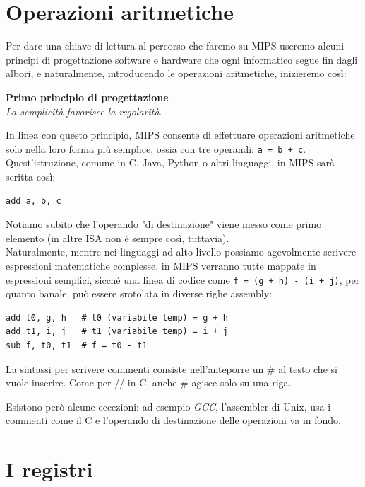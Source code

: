 \documentclass[class=book, crop=false]{standalone}
\begin{document}
\section{Operazioni aritmetiche}
Per dare una chiave di lettura al percorso che faremo su MIPS useremo alcuni principi di progettazione software e hardware che ogni informatico segue fin dagli albori, e naturalmente, introducendo le operazioni aritmetiche, inizieremo così:

\vspace{8pt}
\begin{tcolorbox}
\centering
\textbf{Primo principio di progettazione}\\
\emph{La semplicità favorisce la regolarità}.
\end{tcolorbox}
\vspace{5pt}

In linea con questo principio, MIPS consente di effettuare operazioni aritmetiche solo nella loro forma più semplice, ossia con tre operandi: \texttt{a = b + c}.
Quest'istruzione, comune in C, Java, Python o altri linguaggi, in MIPS sarà scritta così:
\begin{verbatim}
add a, b, c
\end{verbatim}

Notiamo subito che l'operando "di destinazione" viene messo come primo elemento (in altre ISA non è sempre così, tuttavia).\\
Naturalmente, mentre nei linguaggi ad alto livello possiamo agevolmente scrivere espressioni matematiche complesse, in MIPS verranno tutte mappate in espressioni semplici, sicché una linea di codice come \texttt{f = (g + h) - (i + j)}, per quanto banale, può essere srotolata in diverse righe assembly:

\begin{verbatim}
add t0, g, h   # t0 (variabile temp) = g + h
add t1, i, j   # t1 (variabile temp) = i + j
sub f, t0, t1  # f = t0 - t1
\end{verbatim}

La sintassi per scrivere commenti consiste nell'anteporre un \# al testo che si vuole inserire. Come per // in C, anche \# agisce solo su una riga.

Esistono però alcune eccezioni: ad esempio \emph{GCC}, l'assembler di Unix, usa i commenti come il C e l'operando di destinazione delle operazioni va in fondo.

\section{I registri}
\end{document}
